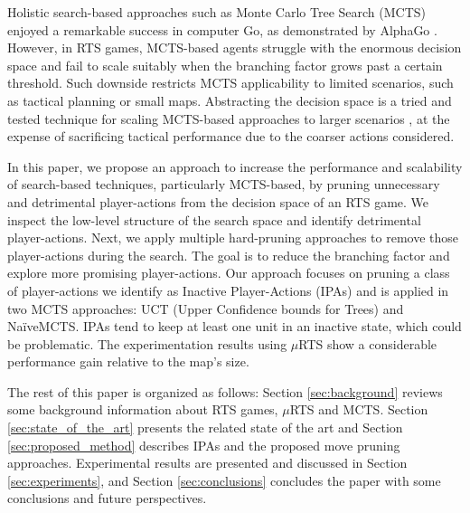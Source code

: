\documentclass[conference]{IEEEtran}
\newcommand{\mRTS}{$\mu$RTS}
\begin{document}
Holistic search-based approaches such as Monte Carlo Tree Search (MCTS) \cite{browne_survey_2012} enjoyed a remarkable success in computer Go, as demonstrated by AlphaGo \cite{silver_mastering_2016}.
 However, in RTS games, MCTS-based agents struggle with the enormous decision space and fail to scale suitably when the branching factor grows past a certain threshold. Such downside restricts MCTS applicability to limited scenarios, such as tactical planning or small maps. Abstracting the decision space is a tried and tested technique for scaling MCTS-based approaches to larger scenarios \cite{ontanon_survey_2013}, 
at the expense of sacrificing tactical performance due to the coarser actions considered.

In this paper, we propose an approach to increase the performance and scalability of search-based techniques, particularly MCTS-based, by pruning unnecessary and detrimental player-actions from the decision space of an RTS game. 
We inspect the low-level structure of the search space and identify detrimental player-actions. Next, we apply multiple hard-pruning approaches to remove those player-actions during the search. The goal is to reduce the branching factor and explore more promising player-actions. Our approach focuses on pruning a class of player-actions we identify as Inactive Player-Actions (IPAs) 
and is applied in two MCTS approaches: UCT (Upper Confidence bounds for Trees)
 and NaïveMCTS. IPAs tend to keep at least one unit in an inactive state, which could be  problematic. The experimentation results using \mRTS{} show a considerable performance gain relative to the map's size.

The rest of this paper is organized as follows: Section \ref{sec:background} reviews some background information about RTS games, \mRTS{} and MCTS. Section \ref{sec:state_of_the_art} presents the related state of the art and Section \ref{sec:proposed_method} describes IPAs and the proposed move pruning approaches. Experimental results are presented and discussed in Section \ref{sec:experiments}, and Section \ref{sec:conclusions} concludes the paper with some conclusions and future perspectives.
\end{document}
